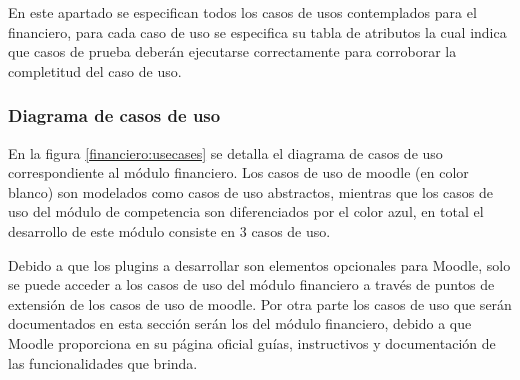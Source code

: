  En este apartado se especifican todos los casos de usos contemplados para el financiero,
 para cada caso de uso se especifica su tabla de atributos la cual indica que casos
 de prueba deberán ejecutarse correctamente para corroborar la completitud del caso de uso.

\subsubsection*{Diagrama de casos de uso}

 En la figura \ref{financiero:usecases} se detalla el diagrama de casos de uso correspondiente al módulo
financiero. Los casos de uso de moodle (en color blanco) son modelados como casos de uso
 abstractos, mientras que los casos de uso del módulo de competencia son diferenciados por el
 color azul, en total el desarrollo de este módulo consiste en 3 casos de uso.


 \noindent
 Debido a que los plugins a desarrollar son elementos opcionales para Moodle, solo se puede
 acceder a los casos de uso del módulo financiero a través de puntos de extensión de los
 casos de uso de moodle. Por otra parte los casos de uso que serán documentados en esta sección
 serán los del módulo financiero, debido a que Moodle proporciona en su página oficial guías,
 instructivos y documentación de las funcionalidades que brinda.





